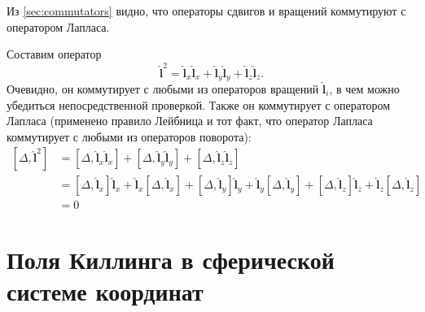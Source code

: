 \documentclass[12pt,a4paper]{article}
\newcommand{\V}[1]{\mathbf{#1}}
\newcommand{\Op}[1]{\hat{\V{#1}}}
\begin{document}
        Из \autoref{sec:commutators} видно, что операторы сдвигов и вращений коммутируют с оператором Лапласа.

        Составим оператор
        \begin{equation}
            \Op{l}^2 = \Op{l}_x \Op{l}_x + \Op{l}_y \Op{l}_y + \Op{l}_z \Op{l}_z .
        \end{equation}
        Очевидно, он коммутирует с любыми из операторов вращений $\Op{l}_i$, в чем можно убедиться непосредственной проверкой. Также он коммутирует с оператором Лапласа (применено правило Лейбница и тот факт, что оператор Лапласа коммутирует с любыми из операторов поворота):
        \begin{equation}\begin{aligned}
            \left[ \Delta, \Op{l}^2 \right]
                &= \left[ \Delta, \Op{l}_x \Op{l}_x \right]
                    + \left[ \Delta, \Op{l}_y \Op{l}_y \right]
                    + \left[ \Delta, \Op{l}_z \Op{l}_z \right] \\
                &= \left[ \Delta, \Op{l}_x \right] \Op{l}_x
                    + \Op{l}_x \left[ \Delta, \Op{l}_x \right]
                    + \left[ \Delta, \Op{l}_y \right] \Op{l}_y
                    + \Op{l}_y \left[ \Delta, \Op{l}_y \right]
                    + \left[ \Delta, \Op{l}_z \right] \Op{l}_z
                    + \Op{l}_z \left[ \Delta, \Op{l}_z \right] \\
                &= 0
        \end{aligned}\end{equation}


    \section{Поля Киллинга в сферической системе координат}
\end{document}
